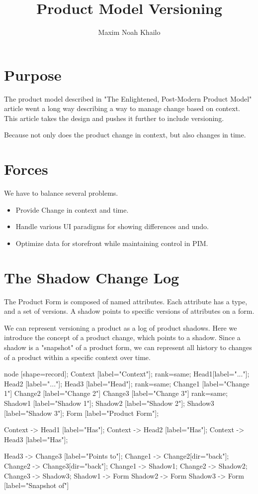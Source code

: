 \documentclass[11pt]{article}
\title{Product Model Versioning}
\author{Maxim Noah Khailo}
\begin{document}
\maketitle
\section{Purpose}

The product model described in "The Enlightened, Post-Modern Product Model" 
article went a long way describing a way to manage change based on context.
This article takes the design and pushes it further to include versioning.

Because not only does the product change in context, but also changes in time.

\section{Forces}

We have to balance several problems.

\begin{itemize}
    \item Provide Change in context and time.
    \item Handle various UI paradigms for showing differences and undo.
    \item Optimize data for storefront while maintaining control in PIM.
\end{itemize}

\section{The Shadow Change Log}

The Product Form is composed of named attributes. Each attribute has a type, and
a set of versions. A shadow points to specific versions of attributes on a form. 

We can represent versioning a product as a log of product shadows. Here we introduce
the concept of a product change, which points to a shadow. Since a shadow is a
"snapshot" of a product form, we can represent all history to changes of a product
within a specific context over time.

 {
    node [shape=record];
    Context [label="Context"];
    {
        rank=same;
        Head1[label="..."];
        Head2 [label="..."];
        Head3 [label="Head"];
    }
    {
        rank=same;
        Change1 [label="Change 1"]
        Change2 [label="Change 2"]
        Change3 [label="Change 3"]
    }
    {
        rank=same;
        Shadow1 [label="Shadow 1"];
        Shadow2 [label="Shadow 2"];
        Shadow3 [label="Shadow 3"];
    }
    Form [label="Product Form"];

    Context -> Head1 [label="Has"];
    Context -> Head2 [label="Has"];
    Context -> Head3 [label="Has"];

    Head3 -> Change3 [label="Points to"];
    Change1 -> Change2[dir="back"];
    Change2 -> Change3[dir="back"];
    Change1 -> Shadow1;
    Change2 -> Shadow2;
    Change3 -> Shadow3;
    Shadow1 -> Form 
    Shadow2 -> Form 
    Shadow3 -> Form [label="Snapshot of"]
}
\end{document}
